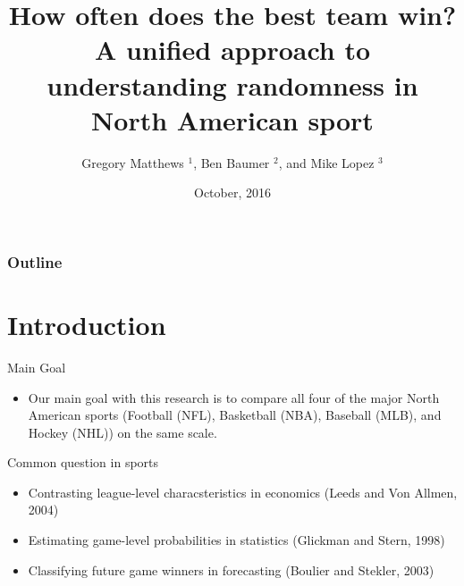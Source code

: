 \documentclass{beamer}\usepackage[]{graphicx}\usepackage[]{color}
\title{How often does the best team win? A unified approach
to understanding randomness in North American sport}
\author{Gregory Matthews $^{1}$, Ben Baumer $^{2}$, and Mike Lopez $^{3}$ }
\institute [Loyola] %
{
  $^{1}$Loyola University Chicago\\
  
  
  $^{2}$Smith College\\
  
  
  $^{3}$Skidmore College\\
  
}
\date[October 2016] %
{October, 2016} %
\begin{document}

\begin{frame}
  \titlepage
\end{frame}

\begin{frame}
  \frametitle{Outline}
  \tableofcontents
\end{frame}


\section{Introduction}


\begin{frame}{Main Goal}
\begin{itemize}
\item Our main goal with this research is to compare all four of the major North American sports (Football (NFL), Basketball (NBA), Baseball (MLB), and Hockey (NHL)) on the same scale.  
\end{itemize}
\end{frame}

\begin{frame}{Common question in sports}
\begin{itemize}
\item Contrasting league-level characsteristics in economics (Leeds and Von Allmen, 2004)
\item Estimating game-level probabilities in statistics (Glickman and Stern, 1998)
\item Classifying future game winners in forecasting (Boulier and Stekler, 2003)
\end{itemize}
\end{frame}
\end{document}
